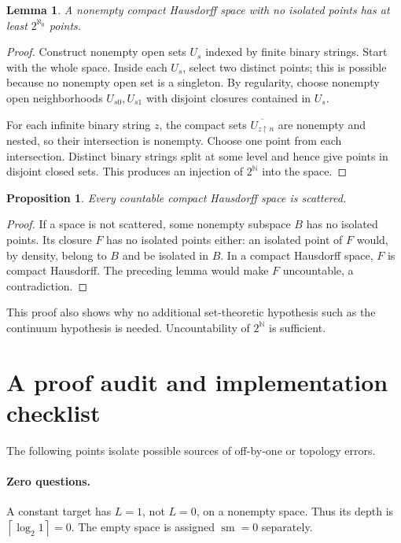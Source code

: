 \documentclass[11pt,letterpaper]{article}
\numberwithin{equation}{section}
\newtheorem{proposition}[proposition]{Proposition}
\newtheorem{lemma}[lemma]{Lemma}
\theoremstyle{definition}
\theoremstyle{remark}
\newcommand{\sm}{\operatorname{sm}}
\newcommand{\ceil}[1]{\left\lceil#1\right\rceil}
\newcommand{\N}{\mathbb N}
\begin{document}
\begin{lemma}
A nonempty compact Hausdorff space with no isolated points has at least
$2^{\aleph_0}$ points.
\end{lemma}
\begin{proof}
Construct nonempty open sets $U_s$ indexed by finite binary strings. Start with
the whole space. Inside each $U_s$, select two distinct points; this is possible
because no nonempty open set is a singleton. By regularity, choose nonempty
open neighborhoods $U_{s0},U_{s1}$ with disjoint closures contained in $U_s$.

For each infinite binary string $z$, the compact sets
$\overline{U_{z\upharpoonright n}}$ are nonempty and nested, so their intersection
is nonempty. Choose one point from each intersection. Distinct binary strings
split at some level and hence give points in disjoint closed sets. This produces
an injection of $2^\N$ into the space.
\end{proof}

\begin{proposition}
Every countable compact Hausdorff space is scattered.
\end{proposition}
\begin{proof}
If a space is not scattered, some nonempty subspace $B$ has no isolated points.
Its closure $F$ has no isolated points either: an isolated point of $F$ would,
by density, belong to $B$ and be isolated in $B$. In a compact Hausdorff space,
$F$ is compact Hausdorff. The preceding lemma would make $F$ uncountable, a
contradiction.
\end{proof}

This proof also shows why no additional set-theoretic hypothesis such as the
continuum hypothesis is needed. Uncountability of $2^\N$ is sufficient.

\section{A proof audit and implementation checklist}

The following points isolate possible sources of off-by-one or topology errors.

\paragraph{Zero questions.}
A constant target has $L=1$, not $L=0$, on a nonempty space. Thus its depth is
$\ceil{\log_2 1}=0$. The empty space is assigned $\sm=0$ separately.
\end{document}
